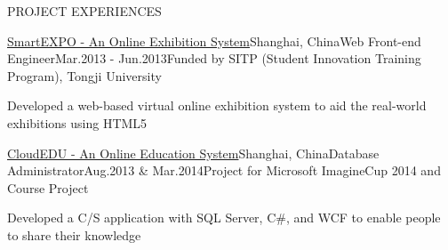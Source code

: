 \documentclass{resume} %
\begin{document}
\begin{rSection}{PROJECT EXPERIENCES}
  \begin{pSubsection}{\href{https://github.com/SmartEXPO}{SmartEXPO - An Online Exhibition System}}{Shanghai,
    China}{Web Front-end Engineer}{Mar.2013 - Jun.2013}{Funded by SITP (Student Innovation Training Program), Tongji University}
  \item Developed a web-based virtual online exhibition system to aid the real-world exhibitions using HTML5
  \end{pSubsection}

  \begin{pSubsection}{\href{https://github.com/CloudEDU}{CloudEDU - An Online Education System}}{Shanghai,
  China}{Database Administrator}{Aug.2013 \& Mar.2014}{Project for Microsoft ImagineCup 2014 and Course Project}
  \item Developed a C/S application with SQL Server, C\#, and WCF to enable people to share their knowledge
  \end{pSubsection}

\end{rSection}

\end{document}
